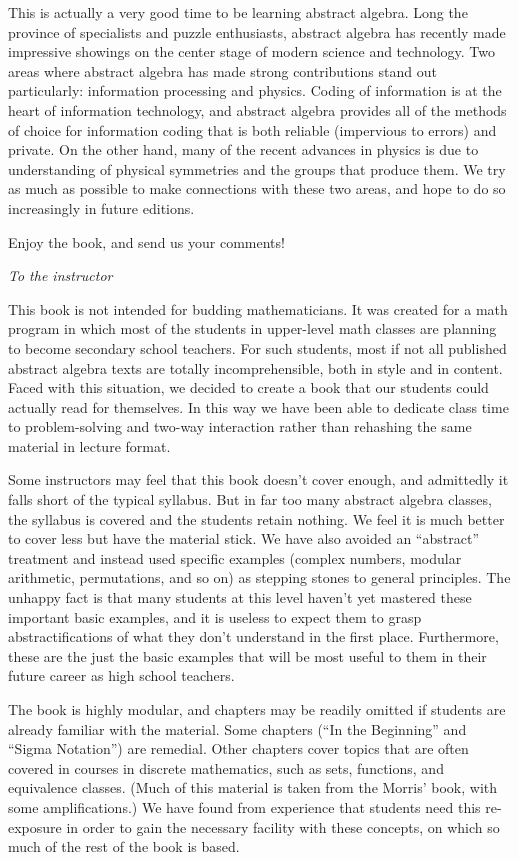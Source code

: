 This is actually a very good time to be learning abstract algebra. Long the province of specialists and puzzle enthusiasts, abstract algebra has recently made  impressive showings on the center stage of modern  science and technology. Two areas where abstract algebra has made strong contributions stand out particularly: information processing and physics. Coding of information is at the heart of information technology, and abstract algebra provides all of the methods of choice for information coding that is both reliable (impervious to errors) and private.  
On the other hand,  many of the recent advances in  physics is due to understanding of physical symmetries and the groups that produce them. We try as much as possible to make connections with these two areas, and hope to do so increasingly in future editions. 

Enjoy the book, and send us your comments!
\medskip

\noindent
\emph{To the instructor}
\smallskip

This book  is not intended for budding mathematicians. It was created for a math program in which most of the students in upper-level math classes are planning to become secondary school teachers. For such students, most if not all published abstract algebra texts are totally incomprehensible, both in style and in content. Faced with this situation, we decided to create a book that our students could actually read for themselves. In this way we have been able to dedicate class time to problem-solving and two-way interaction rather than rehashing the same material in lecture format.

Some instructors may feel that this book doesn’t cover enough, and admittedly it falls short of the typical syllabus. But in far too many abstract algebra classes, the syllabus is covered and the students retain nothing. We feel it is much better to cover less but have the material stick. We have also avoided an ``abstract'' treatment and instead used specific examples (complex numbers, modular arithmetic, permutations, and so on) as stepping stones to general principles. The unhappy fact is that many students at this level haven't yet mastered these important basic examples, and it is useless to expect them to grasp abstractifications of what they don’t understand in the first place. Furthermore, these are the just the basic examples that will be most useful to them in their future career as high school teachers.

The book is highly modular, and chapters may be readily omitted if students are already familiar with the material. Some chapters  (``In the Beginning'' and ``Sigma Notation'') are remedial. Other chapters cover topics that are often covered in courses in discrete mathematics, such as sets, functions, and equivalence classes. (Much of this material is taken from the Morris' book, with some amplifications.) We have found from experience that students need this re-exposure in order to gain the necessary facility with these concepts, on which so much of the rest of the book is based.

